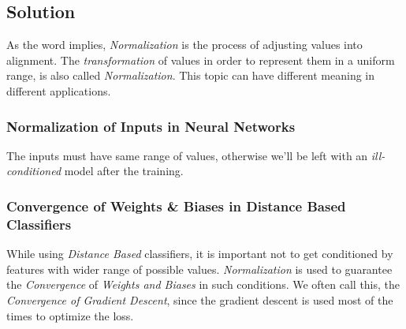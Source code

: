 \documentclass[12pt]{article}
\numberwithin{equation}{section}
\numberwithin{table}{section}
\numberwithin{figure}{section}
\begin{document}
\subsection*{Solution}
As the word implies, \textit{Normalization} is the process of adjusting values into alignment. The \textit{transformation} of values in order to represent them in a uniform range, is also called \textit{Normalization}. This topic can have different meaning in different applications.
\subsubsection*{Normalization of Inputs in Neural Networks}
The inputs must have same range of values, otherwise we'll be left with an \textit{ill-conditioned} model after the training.

\subsubsection*{Convergence of Weights \& Biases in Distance Based Classifiers}
While using \textit{Distance Based} classifiers, it is important not to get conditioned by features with wider range of possible values. \textit{Normalization} is used to guarantee the \textit{Convergence} of \textit{Weights and Biases} in such conditions. We often call this, the \textit{Convergence of Gradient Descent}, since the gradient descent is used most of the times to optimize the loss.
\end{document}
